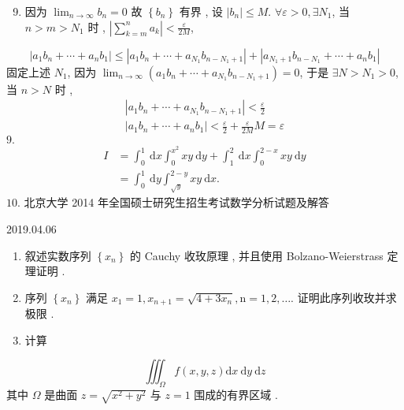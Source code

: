 \documentclass[10pt]{article}
\begin{document}
\begin{enumerate}
  \setcounter{enumi}{8}
  \item  因为  $\lim _{n \rightarrow \infty} b_{n}=0$  故  $\left\{b_{n}\right\}$  有界 ,  设  $\left|b_{n}\right| \leqslant M$. $\forall \varepsilon>0, \exists N_{1}$,  当  $n>m>N_{1}$  时 , $\left|\sum_{k=m}^{n} a_{k}\right|<\frac{\varepsilon}{2 M}$,
\end{enumerate}
$$
\left|a_{1} b_{n}+\cdots+a_{n} b_{1}\right| \leqslant\left|a_{1} b_{n}+\cdots+a_{N_{1}} b_{n-N_{1}+1}\right|+\left|a_{N_{1}+1} b_{n-N_{1}}+\cdots+a_{n} b_{1}\right|
$$
 固定上述  $N_{1}$,  因为  $\lim _{n \rightarrow \infty}\left(a_{1} b_{n}+\cdots+a_{N_{1}} b_{n-N_{1}+1}\right)=0$,  于是  $\exists N>N_{1}>0$,  当  $n>N$  时 ,
$$
\begin{gathered}
\left|a_{1} b_{n}+\cdots+a_{N_{1}} b_{n-N_{1}+1}\right|<\frac{\varepsilon}{2} \\
\left|a_{1} b_{n}+\cdots+a_{n} b_{1}\right|<\frac{\varepsilon}{2}+\frac{\varepsilon}{2 M} M=\varepsilon
\end{gathered}
$$
$9 .$
$$
\begin{aligned}
I &=\int_{0}^{1} \mathrm{~d} x \int_{0}^{x^{2}} x y \mathrm{~d} y+\int_{1}^{2} \mathrm{~d} x \int_{0}^{2-x} x y \mathrm{~d} y \\
&=\int_{0}^{1} \mathrm{~d} y \int_{\sqrt{y}}^{2-y} x y \mathrm{~d} x .
\end{aligned}
$$
$10 .$  北京大学  2014  年全国硕士研究生招生考试数学分析试题及解答     

2019.04.06

\begin{enumerate}
  \item  叙述实数序列  $\left\{x_{n}\right\}$  的  Cauchy  收玫原理 ,  并且使用  Bolzano-Weierstrass  定理证明 .

  \item  序列  $\left\{x_{n}\right\}$  满足  $x_{1}=1, x_{n+1}=\sqrt{4+3 x_{n}}, \mathrm{n}=1,2, \ldots$.  证明此序列收玫并求极限 .

  \item  计算 

\end{enumerate}
$$
\iiint_{\Omega} f(x, y, z) \mathrm{d} x \mathrm{~d} y \mathrm{~d} z
$$
 其中  $\Omega$  是曲面  $z=\sqrt{x^{2}+y^{2}}$  与  $z=1$  围成的有界区域 .
\end{document}
